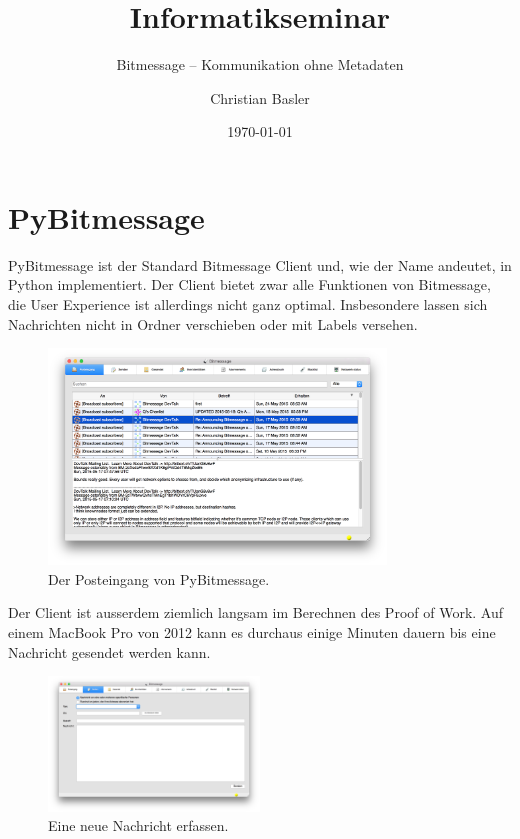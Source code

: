 \documentclass{bfh}
\title{Informatikseminar}
\subtitle{Bitmessage -- Kommunikation ohne Metadaten}
\author{Christian Basler}
\date{\today}
\begin{document}
  \maketitle

  \tableofcontents

  \newpage
  

  \newpage
  \section{PyBitmessage}

  PyBitmessage ist der Standard Bitmessage Client und, wie der Name andeutet, in Python implementiert. Der Client bietet zwar alle Funktionen von Bitmessage, die User Experience ist allerdings nicht ganz optimal. Insbesondere lassen sich Nachrichten nicht in Ordner verschieben oder mit Labels versehen.

  \begin{figure}[h]
  \centering
  \includegraphics[width=0.8\textwidth]{images/PyBitmessage-Inbox.png}
  \caption[PyBitmessage: Inbox]{Der Posteingang von PyBitmessage.}
  \label{fig:inbox}
  \end{figure}

  Der Client ist ausserdem ziemlich langsam im Berechnen des Proof of Work. Auf einem MacBook Pro von 2012 kann es durchaus einige Minuten dauern bis eine Nachricht gesendet werden kann.

  \begin{figure}
  \centering
  \includegraphics[width=0.5\textwidth]{images/PyBitmessage-Send.png}
  \caption[PyBitmessage: Senden]{Eine neue Nachricht erfassen.}
  \label{fig:inbox}
  \end{figure}
\end{document}
